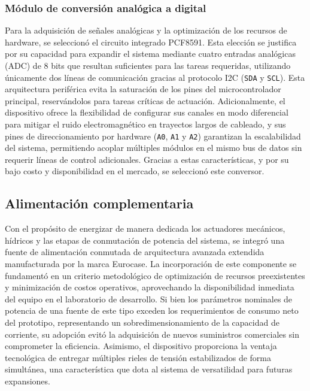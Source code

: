 \subsubsection{Módulo de conversión analógica a digital}

Para la adquisición de señales analógicas y la optimización de los recursos de hardware, se seleccionó el circuito integrado PCF8591. Esta elección se justifica por su capacidad para expandir el sistema mediante cuatro entradas analógicas (ADC) de 8 bits que resultan suficientes para las tareas requeridas, utilizando únicamente dos líneas de comunicación gracias al protocolo I2C (\texttt{SDA} y \texttt{SCL}). Esta arquitectura periférica evita la saturación de los pines del microcontrolador principal, reservándolos para tareas críticas de actuación. Adicionalmente, el dispositivo ofrece la flexibilidad de configurar sus canales en modo diferencial para mitigar el ruido electromagnético en trayectos largos de cableado, y sus pines de direccionamiento por hardware (\texttt{A0}, \texttt{A1} y \texttt{A2}) garantizan la escalabilidad del sistema, permitiendo acoplar múltiples módulos en el mismo bus de datos sin requerir líneas de control adicionales. Gracias a estas características, y por su bajo costo y disponibilidad en el mercado, se seleccionó este conversor.

\subsection{Alimentación complementaria}
\label{subsec:alimentacion_complementaria}

Con el propósito de energizar de manera dedicada los actuadores mecánicos, hídricos y las etapas de conmutación de potencia del sistema, se integró una fuente de alimentación conmutada de arquitectura avanzada extendida manufacturada por la marca Eurocase. La incorporación de este componente se fundamentó en un criterio metodológico de optimización de recursos preexistentes y minimización de costos operativos, aprovechando la disponibilidad inmediata del equipo en el laboratorio de desarrollo. Si bien los parámetros nominales de potencia de una fuente de este tipo exceden los requerimientos de consumo neto del prototipo, representando un sobredimensionamiento de la capacidad de corriente, su adopción evitó la adquisición de nuevos suministros comerciales sin comprometer la eficiencia. Asimismo, el dispositivo proporciona la ventaja tecnológica de entregar múltiples rieles de tensión estabilizados de forma simultánea, una característica que dota al sistema de versatilidad para futuras expansiones.

